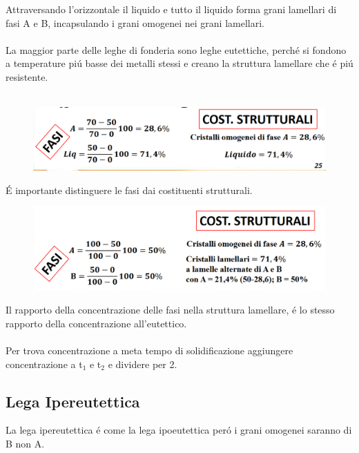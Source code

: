 \documentclass{article}
\begin{document}
{\begin{figure}[h!]
            \end{figure}
            Attraversando l'orizzontale il liquido e tutto il liquido forma grani lamellari di fasi A e B, incapsulando i grani omogenei nei grani lamellari.\\ \\
            La maggior parte delle leghe di fonderia sono leghe eutettiche, perch\'e si fondono a temperature pi\'u basse dei metalli stessi e creano la struttura lamellare che \'e pi\'u resistente.\\ \\
            \begin{figure}[h!]
                \centering
                \includegraphics[width=.85\linewidth]{Calcoli per Fasi e Costituenti nella lega ipoeutettica prima di TEU.png}
            \end{figure}
            \'E importante distinguere le fasi dai costituenti strutturali.
            \begin{figure}[h!]
                \centering
                \includegraphics[width=.85\linewidth]{Calcoli per Fasi e Costituenti nella lega ipoeutettica dopo di TEU.png}
            \end{figure}
            Il rapporto della concentrazione delle fasi nella struttura lamellare, \'e lo stesso rapporto della concentrazione all'eutettico.\\ \\
            Per trova concentrazione a meta tempo di solidificazione aggiungere concentrazione a t$_1$ e t$_2$ e dividere per 2.
        \subsection{Lega Ipereutettica}
            La lega ipereutettica \'e come la lega ipoeutettica per\'o i grani omogenei saranno di B non A.
            \newpage
}
\end{document}
